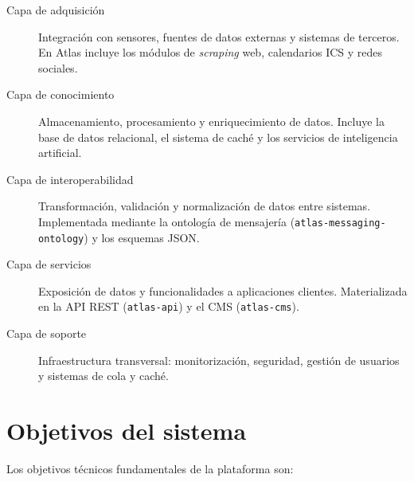 \begin{description}
  \item[Capa de adquisición] Integración con sensores, fuentes de datos externas y sistemas de terceros. En Atlas incluye los módulos de \textit{scraping} web, calendarios ICS y redes sociales.

  \item[Capa de conocimiento] Almacenamiento, procesamiento y enriquecimiento de datos. Incluye la base de datos relacional, el sistema de caché y los servicios de inteligencia artificial.

  \item[Capa de interoperabilidad] Transformación, validación y normalización de datos entre sistemas. Implementada mediante la ontología de mensajería (\texttt{atlas-messaging-ontology}) y los esquemas JSON.

  \item[Capa de servicios] Exposición de datos y funcionalidades a aplicaciones clientes. Materializada en la API REST (\texttt{atlas-api}) y el CMS (\texttt{atlas-cms}).

  \item[Capa de soporte] Infraestructura transversal: monitorización, seguridad, gestión de usuarios y sistemas de cola y caché.
\end{description}

\section{Objetivos del sistema}

Los objetivos técnicos fundamentales de la plataforma son:

